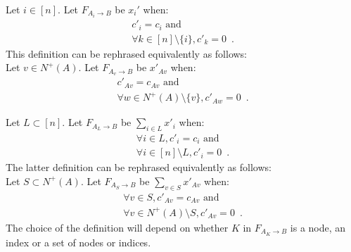 \begin{definition}

   Let $i \in [n]$. Let $F_{A_i \rightarrow B}$ be $x_i'$ when:
   \begin{equation*}
   \begin{gathered}
      c'_i = c_i \mbox{ and} \\
      \forall k \in [n] \setminus \{i\}, c'_k = 0 \enspace.
   \end{gathered}
   \end{equation*}
   This definition can be rephrased equivalently as follows: \\
   Let $v \in N^{+}\left(A\right)$. Let $F_{A_v \rightarrow B}$ be $x'_{Av}$ when:
   \begin{equation*}
   \begin{gathered}
      c'_{Av} = c_{Av} \mbox{ and} \\
      \forall w \in N^{+}\left(A\right) \setminus \{v\}, c'_{Aw} = 0 \enspace.
   \end{gathered}
   \end{equation*}

   Let $L \subset [n]$. Let $F_{A_L \rightarrow B}$ be $\sum\limits_{i \in L}x'_i$ when:
   \begin{equation*}
   \begin{gathered}
      \forall i \in L, c'_i = c_i \mbox{ and} \\ 
      \forall i \in [n] \setminus L, c'_i = 0 \enspace.
   \end{gathered}
   \end{equation*} 
   The latter definition can be rephrased equivalently as follows: \\
   Let $S \subset N^{+}(A)$. Let $F_{A_S \rightarrow B}$ be
   $\sum\limits_{v \in S}x'_{Av}$ when:
   \begin{equation*}
   \begin{gathered}
      \forall v \in S, c'_{Av} = c_{Av} \mbox{ and} \\
      \forall v \in N^{+}(A) \setminus S, c'_{Av} = 0 \enspace.
   \end{gathered}
   \end{equation*}
   The choice of the definition will depend on whether $K$ in $F_{A_K \rightarrow B}$ is a node, an index or a set of nodes
   or indices.
\end{definition}
